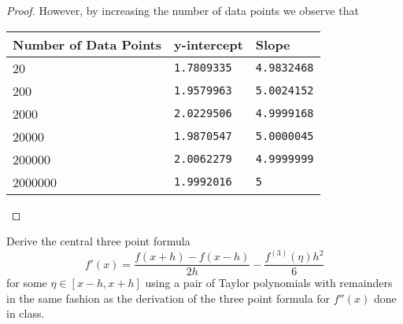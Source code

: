 \documentclass[8pt]{article}
\theoremstyle{definition}
\newenvironment{exercise}[1]
  {\renewcommand\theinnerexercise{#1}\innerexercise}
  {\endinnerexercise}
\begin{document}
\begin{proof}
However, by increasing the number of data points we observe that
\begin{center}
    \begin{tabular}{ | l | l | l |}
    \hline
    Number of Data Points & y-intercept & Slope \\ \hline
    20 & \texttt{1.7809335} & \texttt{4.9832468} \\ \hline
    200 & \texttt{1.9579963} & \texttt{5.0024152} \\ \hline
    2000 & \texttt{2.0229506} & \texttt{4.9999168} \\ \hline
    20000 & \texttt{1.9870547} & \texttt{5.0000045} \\ \hline
    200000 & \texttt{2.0062279} & \texttt{4.9999999} \\ \hline
    2000000 & \texttt{1.9992016} & \texttt{5} \\ \hline
    \end{tabular}
\end{center}
\end{proof}


\begin{exercise}{5}
Derive the central three point formula $$f'(x) = \frac{f(x + h) - f(x - h)}{2h} - \frac{f^{(3)}(\eta) h^2}{6}$$ for some $\eta \in [x - h, x + h]$ using a pair of Taylor polynomials with remainders in the same fashion as the derivation of the three point formula for $f''(x)$ done in class.
\end{exercise}
\end{document}
